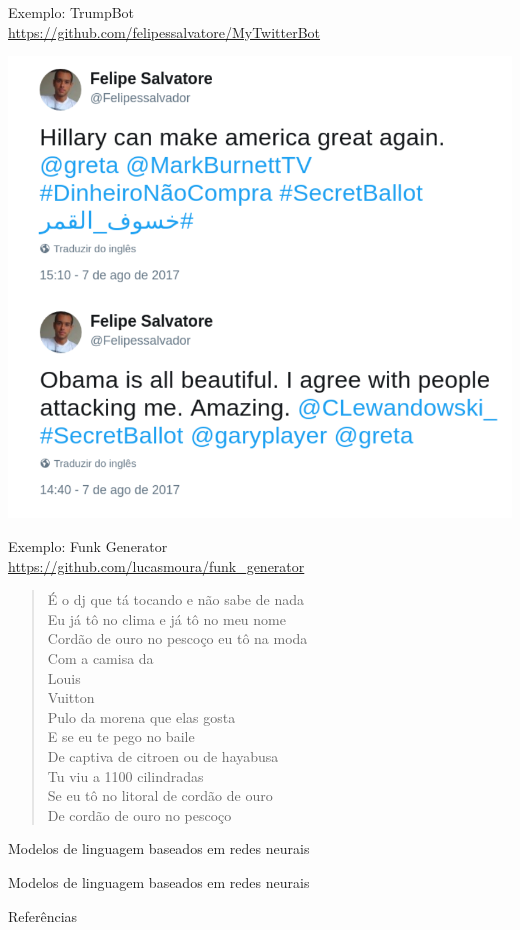 \documentclass[10pt]{beamer}
\begin{document}
\begin{frame}{Exemplo: TrumpBot\\\url{https://github.com/felipessalvatore/MyTwitterBot}}
\begin{center}
\includegraphics[scale=0.24]{images/TrumpBot.png}
\end{center}
\end{frame}


\begin{frame}{Exemplo: Funk Generator\\ \url{https://github.com/lucasmoura/funk_generator}}
\begin{quote}
\centering
É o dj que tá tocando e não sabe de nada\\ 
Eu já tô no clima e já tô no meu nome \\
Cordão de ouro no pescoço eu tô na moda \\
Com a camisa da \\
Louis \\
Vuitton \\
Pulo da morena que elas gosta\\ 
E se eu te pego no baile \\
De captiva de citroen ou de hayabusa\\ 
Tu viu a 1100 cilindradas \\
Se eu tô no litoral de cordão de ouro\\ 
De cordão de ouro no pescoço\\
\end{quote}
\end{frame}


\begin{frame}{Modelos de linguagem baseados em redes neurais}

\end{frame}


\begin{frame}{Modelos de linguagem baseados em redes neurais}

\end{frame}


\begin{frame}[allowframebreaks]{Referências}

  
  

\end{frame}
\end{document}
